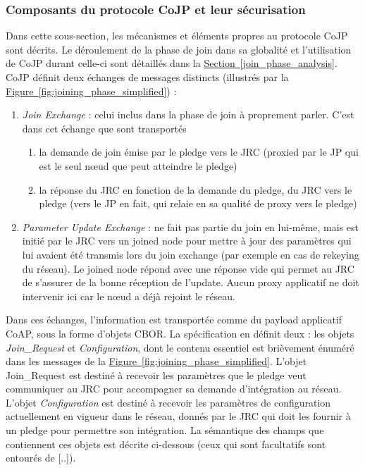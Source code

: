 \documentclass[]{report}
\newcommand{\wordlink}[2]{\hyperref[#2]{#1~\ref{#2}}}
\begin{document}
\newpage

\subsubsection{Composants du protocole CoJP et leur sécurisation}
\label{CoJP_components}

Dans cette sous-section, les mécanismes et éléments propres au protocole CoJP sont décrits. Le déroulement de la phase de join dans sa globalité et l'utilisation de CoJP durant celle-ci sont détaillés dans la \wordlink{Section}{join_phase_analysis}. CoJP définit deux échanges de messages distincts (illustrés par la \wordlink{Figure}{fig:joining_phase_simplified}) :
\vspace{0.3cm}
\begin{enumerate}
\item \textit{Join Exchange} : celui inclus dans la phase de join à proprement parler. C'est dans cet échange que sont transportés 
	\begin{enumerate}
	\item la demande de join émise par le pledge vers le JRC (proxied par le JP qui est le seul nœud que peut atteindre le pledge)
	\item la réponse du JRC en fonction de la demande du pledge, du JRC vers le pledge (vers le JP en fait, qui relaie en sa qualité de proxy vers le pledge)
	\end{enumerate}
\vspace{0.2cm}	
\item \textit{Parameter Update Exchange} : ne fait pas partie du join en lui-même, mais est initié par le JRC vers un joined node pour mettre à jour des paramètres qui lui avaient été transmis lors du join exchange (par exemple en cas de rekeying du réseau). Le joined node répond avec une réponse vide qui permet au JRC de s'assurer de la bonne réception de l'update. Aucun proxy applicatif ne doit intervenir ici car le nœud a déjà rejoint le réseau.
\end{enumerate} 
\vspace{0.3cm}

Dans ces échanges, l'information est transportée comme du payload applicatif CoAP, sous la forme d'objets CBOR. La spécification \cite{ietf-6tisch-minimal-security-15}  en définit deux : les objets \textit{Join\_Request} et \textit{Configuration}, dont le contenu essentiel est brièvement énuméré dans les messages de la \wordlink{Figure}{fig:joining_phase_simplified}. L'objet Join\_Request est destiné à recevoir les paramètres que le pledge veut communiquer au JRC pour accompagner sa demande d'intégration au réseau. L'objet \textit{Configuration} est destiné à recevoir les paramètres de configuration actuellement en vigueur dans le réseau, donnés par le JRC qui doit les fournir à un pledge pour permettre son intégration. La sémantique des champs que contiennent ces objets est décrite ci-dessous (ceux qui sont facultatifs sont entourés de [..]).\\
\end{document}
